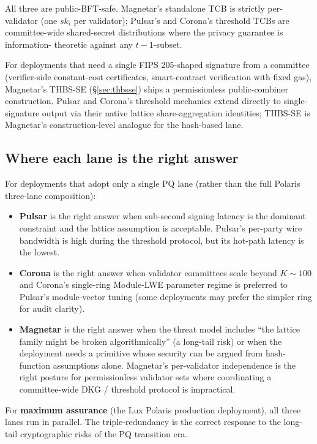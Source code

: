 All three are public-BFT-safe. Magnetar's standalone TCB is
strictly per-validator (one $sk_i$ per validator); Pulsar's and
Corona's threshold TCBs are committee-wide shared-secret
distributions where the privacy guarantee is information-
theoretic against any $t-1$-subset.

For deployments that need a single FIPS 205-shaped signature from
a committee (verifier-side constant-cost certificates,
smart-contract verification with fixed gas), Magnetar's THBS-SE
(\S\ref{sec:thbsse}) ships a permissionless public-combiner
construction. Pulsar and Corona's threshold mechanics extend
directly to single-signature output via their native lattice
share-aggregation identities; THBS-SE is Magnetar's
construction-level analogue for the hash-based lane.

\subsection{Where each lane is the right answer}
\label{sec:cmp:fit}

For deployments that adopt only a single PQ lane (rather than the
full Polaris three-lane composition):
\begin{itemize}[leftmargin=2em,nosep]
  \item \textbf{Pulsar} is the right answer when sub-second
        signing latency is the dominant constraint and the lattice
        assumption is acceptable. Pulsar's per-party wire bandwidth
        is high during the threshold protocol, but its hot-path
        latency is the lowest.
  \item \textbf{Corona} is the right answer when validator
        committees scale beyond $K \sim 100$ and Corona's
        single-ring Module-LWE parameter regime is preferred to
        Pulsar's module-vector tuning (some deployments may prefer
        the simpler ring for audit clarity).
  \item \textbf{Magnetar} is the right answer when the
        threat model includes ``the lattice family might be broken
        algorithmically'' (a long-tail risk) or when the deployment
        needs a primitive whose security can be argued from
        hash-function assumptions alone. Magnetar's per-validator
        independence is the right posture for permissionless
        validator sets where coordinating a committee-wide DKG /
        threshold protocol is impractical.
\end{itemize}

For \textbf{maximum assurance} (the Lux Polaris production
deployment), all three lanes run in parallel. The triple-redundancy
is the correct response to the long-tail cryptographic risks of
the PQ transition era.

